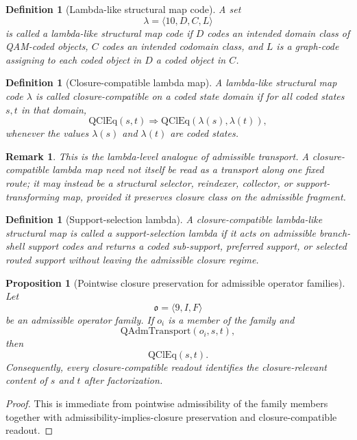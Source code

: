 \documentclass[12pt,a4paper]{article}
\newtheorem{proposition}[theorem]{Proposition}
\newtheorem{definition}[theorem]{Definition}
\newtheorem{remark}[theorem]{Remark}
\begin{document}
\begin{definition}[Lambda-like structural map code]
A set
\[
\lambda=\langle 10,D,C,L\rangle
\]
is called a \emph{lambda-like structural map code} if $D$ codes an intended domain class of QAM-coded objects, $C$ codes an intended codomain class, and $L$ is a graph-code assigning to each coded object in $D$ a coded object in $C$.
\end{definition}

\begin{definition}[Closure-compatible lambda map]
A lambda-like structural map code $\lambda$ is called \emph{closure-compatible} on a coded state domain if for all coded states $s,t$ in that domain,
\[
\mathrm{QClEq}(s,t)
\Longrightarrow
\mathrm{QClEq}(\lambda(s),\lambda(t)),
\]
whenever the values $\lambda(s)$ and $\lambda(t)$ are coded states.
\end{definition}

\begin{remark}
This is the lambda-level analogue of admissible transport. A closure-compatible lambda map need not itself be read as a transport along one fixed route; it may instead be a structural selector, reindexer, collector, or support-transforming map, provided it preserves closure class on the admissible fragment.
\end{remark}

\begin{definition}[Support-selection lambda]
A closure-compatible lambda-like structural map is called a \emph{support-selection lambda} if it acts on admissible branch-shell support codes and returns a coded sub-support, preferred support, or selected routed support without leaving the admissible closure regime.
\end{definition}

\begin{proposition}[Pointwise closure preservation for admissible operator families]
Let
\[
\mathfrak{o}=\langle 9,I,F\rangle
\]
be an admissible operator family. If $o_i$ is a member of the family and
\[
\mathrm{QAdmTransport}(o_i,s,t),
\]
then
\[
\mathrm{QClEq}(s,t).
\]
Consequently, every closure-compatible readout identifies the closure-relevant content of $s$ and $t$ after factorization.
\end{proposition}

\begin{proof}
This is immediate from pointwise admissibility of the family members together with admissibility-implies-closure preservation and closure-compatible readout.
\end{proof}
\end{document}
